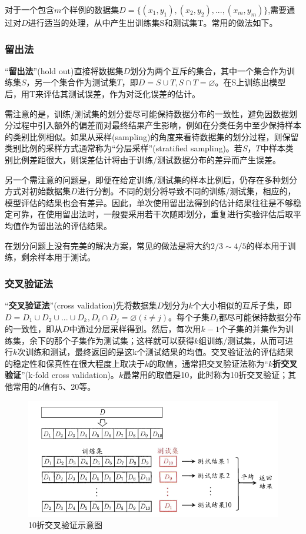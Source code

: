 \documentclass[cn,hazy,black,normal]{elegantnote}
\numberwithin{equation}{section}
\numberwithin{figure}{section}
\begin{document}
			对于一个包含$m$个样例的数据集$D = \{(x_1,y_1),(x_2,y_2),...,(x_m,y_m)\}$,需要通过对$D$进行适当的处理，从中产生出训练集S和测试集T。常用的做法如下。
			
			\subsubsection{留出法}
				“\textbf{留出法}”(hold out)直接将数据集$D$划分为两个互斥的集合，其中一个集合作为训练集$S$，另一个集合作为测试集$T$，即$D=S\cup T, S\cap T=\varnothing$。在S上训练出模型后，用T来评估其测试误差，作为对泛化误差的估计。
				
				需注意的是，训练/测试集的划分要尽可能保持数据分布的一致性，避免因数据划分过程中引入额外的偏差而对最终结果产生影响，例如在分类任务中至少保持样本的类别比例相似。如果从采样(sampling)的角度来看待数据集的划分过程，则保留类别比例的采样方式通常称为“分层采样”(stratified sampling)。若$S$，$T$中样本类别比例差距很大，则误差估计将由于训练/测试数据分布的差异而产生误差。
			
				另一个需注意的问题是，即便在给定训练/测试集的样本比例后，仍存在多种划分方式对初始数据集$D$进行分割。不同的划分将导致不同的训练/测试集，相应的，模型评估的结果也会有差异。因此，单次使用留出法得到的估计结果往往是不够稳定可靠，在使用留出法时，一般要采用若干次随即划分，重复进行实验评估后取平均值作为留出法的评估结果。
				
				在划分问题上没有完美的解决方案，常见的做法是将大约$2/3 \sim 4/5$的样本用于训练，剩余样本用于测试。
				
			\subsubsection{交叉验证法}
				“\textbf{交叉验证法}”(cross validation)先将数据集$D$划分为$k$个大小相似的互斥子集，即$D=D_1\cup D_2\cup ...\cup D_k, D_i\cap D_j =\varnothing(i\neq j)$。每个子集$D_i$都尽可能保持数据分布的一致性，即从$D$中通过分层采样得到。然后，每次用$k-1$个子集的并集作为训练集，余下的那个子集作为测试集；这样就可以获得$k$组训练/测试集，从而可进行$k$次训练和测试，最终返回的是这k个测试结果的均值。交叉验证法的评估结果的稳定性和保真性在很大程度上取决于$k$的取值，通常把交叉验证法称为“\textbf{$k$折交叉验证}”(k-fold cross validation)。$k$最常用的取值是10，此时称为10折交叉验证；其他常用的$k$值有5、20等。
				
				\begin{figure}[H]
					\centering
					\includegraphics[width=.7\linewidth]{images/10-fold.png}
					\caption{{\rm 10折交叉验证示意图}}
					\label{10-fold}
				\end{figure}
			
\end{document}
